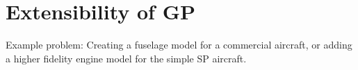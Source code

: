\chapter{Extensibility of \gls{GP}}

Example problem: Creating a fuselage model for a commercial aircraft, or adding a higher fidelity engine model for the simple SP aircraft. 